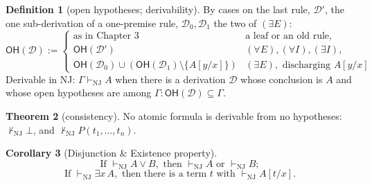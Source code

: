 \documentclass[a4paper, 11pt]{article}
\theoremstyle{definition}
\newtheorem{definition}{Definition}[section]
\newtheorem{theorem}[definition]{Theorem}
\newtheorem{corollary}[definition]{Corollary}
\begin{document}
\begin{definition}[open hypotheses; derivability]
    By cases on the last rule, $\mathcal{D}'$, the one sub-derivation of a one-premise rule, $\mathcal{D}_0, \mathcal{D}
    _1$ the two of $(\exists E)$:
    \[
    \mathsf{OH}(\mathcal{D}) :=
    \begin{cases}
    \text{as in Chapter 3} &\text{a leaf or an old rule}, \\
    \mathsf{OH}(\mathcal{D}') &(\forall E), (\forall I), (\exists I), \\
    \mathsf{OH}(\mathcal{D}_0) \cup (\mathsf{OH}(\mathcal{D}_1) \setminus \{A[y/x]\}) &(\exists E), \text{ discharging }
    A[y/x]
    \end{cases}
    \]
    Derivable in NJ: $\Gamma \vdash_{\text{NJ}} A$ when there is a derivation $\mathcal{D}$ whose conclusion is $A$ and
    whose open hypotheses are among $\Gamma: \mathsf{OH}(\mathcal{D}) \subseteq \Gamma$.
\end{definition}

\begin{theorem}[consistency]
    No atomic formula is derivable from no hypotheses: $\not \vdash_{\text{NJ}} \bot$, and $\not \vdash_{\text{NJ}} P(
    t_1, \dots, t_n)$.
\end{theorem}


\begin{corollary}[Disjunction \& Existence property] \leavevmode \\
    \[\text{If }\vdash_{\text{NJ}} A \lor B, \text{ then }\vdash_{\text{NJ}} A \text{ or }\vdash_{\text{NJ}} B; \]
    \[\text{If } \vdash_{\text{NJ}} \exists x \, A, \text{ then there is a term } t \text{ with } \vdash_\text{NJ} A[t/x].\]
\end{corollary}
\end{document}
